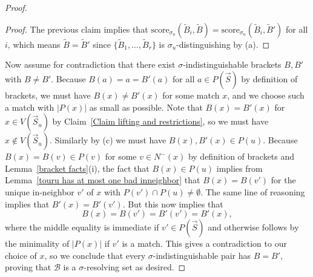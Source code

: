 \documentclass[12pt,letterpaper]{article}
\theoremstyle{definition}
\newcommand{\sig}{\sigma}
\renewcommand{\1}{\mathbbm{1}}
\renewcommand{\c}[1]{\mathcal{#1}}
\newcommand{\score}{\mathrm{score}}
\newcommand{\tour}{\vec{S}}
\begin{document}
\begin{proof}
	\begin{proof}
		The previous claim implies that $\score_{\sig_u}(\widetilde{B}_i,\widetilde{B})=\score_{\sig_u}(\widetilde{B}_i,\widetilde{B}')$ for all $i$, which means $\widetilde{B}=\widetilde{B}'$ since $\{\widetilde{B}_1,\ldots,\widetilde{B}_r\}$ is $\sig_u$-distinguishing by (a).
	\end{proof}
	Now assume for contradiction that there exist $\sig$-indistinguishable brackets $B,B'$ with $B\ne B'$.  Because $B(a)=a=B'(a)$ for all $a\in P(\tour)$ by definition of brackets, we must have $B(x)\ne B'(x)$ for some match $x$, and we choose such a match with $|P(x)|$ as small as possible.  Note that $B(x)=B'(x)$ for $x\in V(\tour_u)$ by Claim~\ref{Claim lifting and restrictions}, so we must have $x\notin V(\tour_u)$.  Similarly by (c) we must have $B(x),B'(x)\in P(u)$.  Because $B(x)=B(v)\in P(v)$ for some $v\in N^-(x)$ by definition of brackets and Lemma~\ref{bracket facts}(i), the fact that $B(x)\in P(u)$ implies from Lemma~\ref{touru has at most one bad inneighbor} that $B(x)=B(v')$ for the unique in-neighbor $v'$ of $x$ with $P(v')\cap P(u)\ne \emptyset$.  The same line of reasoning implies that $B'(x)=B'(v')$.  But this now implies that
	\[B(x)=B(v')=B'(v')=B'(x),\]
	where the middle equality is immediate if $v'\in P(\tour)$ and otherwise follows by the minimality of $|P(x)|$ if $v'$ is a match.  This gives a contradiction to our choice of $x$, so we conclude that every $\sig$-indistinguishable pair has $B=B'$, proving that $\c{B}$ is a $\sig$-resolving set as desired. 
\end{proof}
\end{document}
